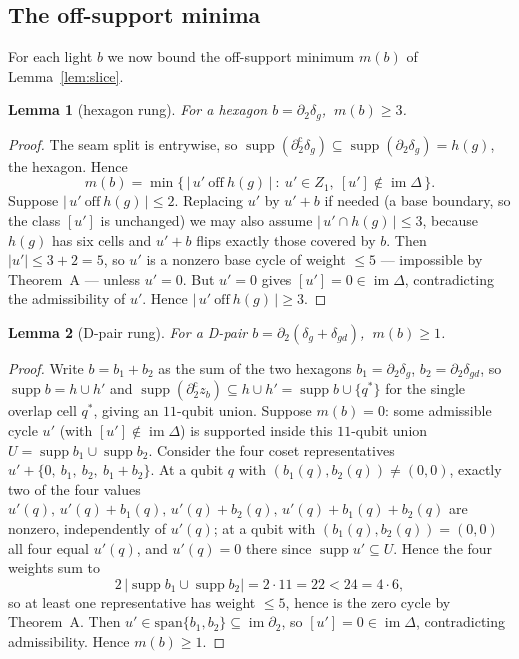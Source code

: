 \documentclass[11pt]{article}
\newcommand{\wt}[1]{\lvert #1\rvert}
\DeclareMathOperator{\img}{im}
\DeclareMathOperator{\supp}{supp}
\newcommand{\dcut}{\partial_2^{\mathrm{c}}}     %
\newcommand{\cmap}{\Delta}                       %
\theoremstyle{plain}
\newtheorem{lemma}{Lemma}[section]
\theoremstyle{definition}
\theoremstyle{remark}
\begin{document}
\subsection{The off-support minima}\label{subsec:rungs}

For each light $b$ we now bound the off-support minimum $m(b)$ of
Lemma~\ref{lem:slice}.

\begin{lemma}[hexagon rung]\label{lem:rung-hex}
For a hexagon $b=\partial_2\delta_g$, $\ m(b)\ge 3$.
\end{lemma}

\begin{proof}
The seam split is entrywise, so $\supp(\dcut\delta_g)\subseteq\supp(\partial_2\delta_g)=
h(g)$, the hexagon. Hence
\[
  m(b)=\min\bigl\{\,\bigl|\,u'\ \text{off}\ h(g)\,\bigr|\ :\ u'\in Z_1,\
  [u']\notin\img\cmap\,\bigr\}.
\]
Suppose $\bigl|\,u'\ \text{off}\ h(g)\,\bigr|\le 2$. Replacing $u'$ by $u'+b$ if needed
(a base boundary, so the class $[u']$ is unchanged) we may also assume
$\bigl|\,u'\cap h(g)\,\bigr|\le 3$, because $h(g)$ has six
cells and $u'+b$ flips exactly those covered by $b$. Then $\wt{u'}\le 3+2=5$, so $u'$ is a
nonzero base cycle of weight $\le 5$ --- impossible by Theorem~A --- unless $u'=0$. But
$u'=0$ gives $[u']=0\in\img\cmap$, contradicting the admissibility of $u'$. Hence
$\bigl|\,u'\ \text{off}\ h(g)\,\bigr|\ge 3$.
\end{proof}

\begin{lemma}[D-pair rung]\label{lem:rung-dpair}
For a D-pair $b=\partial_2(\delta_g+\delta_{gd})$, $\ m(b)\ge 1$.
\end{lemma}

\begin{proof}
Write $b=b_1+b_2$ as the sum of the two hexagons $b_1=\partial_2\delta_g$,
$b_2=\partial_2\delta_{gd}$, so $\supp b=h\cup h'$ and $\supp(\dcut z_b)\subseteq h\cup h'
=\supp b\cup\{q^\ast\}$ for the single overlap cell $q^\ast$, giving an $11$-qubit union.
Suppose $m(b)=0$: some admissible cycle $u'$ (with $[u']\notin\img\cmap$) is supported
inside this $11$-qubit union $U=\supp b_1\cup\supp b_2$. Consider the four coset
representatives $u'+\{0,\ b_1,\ b_2,\ b_1+b_2\}$. At a qubit $q$ with
$(b_1(q),b_2(q))\ne(0,0)$, exactly two of the four values
$u'(q),\,u'(q)+b_1(q),\,u'(q)+b_2(q),\,u'(q)+b_1(q)+b_2(q)$ are nonzero, independently of
$u'(q)$; at a qubit with $(b_1(q),b_2(q))=(0,0)$ all four equal $u'(q)$, and $u'(q)=0$ there
since $\supp u'\subseteq U$. Hence the four weights sum to
\[
  2\,\bigl|\supp b_1\cup\supp b_2\bigr|=2\cdot 11=22<24=4\cdot 6,
\]
so at least one representative has weight $\le 5$, hence is the zero cycle by Theorem~A.
Then $u'\in\mathrm{span}\{b_1,b_2\}\subseteq\img\partial_2$, so $[u']=0\in\img\cmap$,
contradicting admissibility. Hence $m(b)\ge 1$.
\end{proof}
\end{document}
